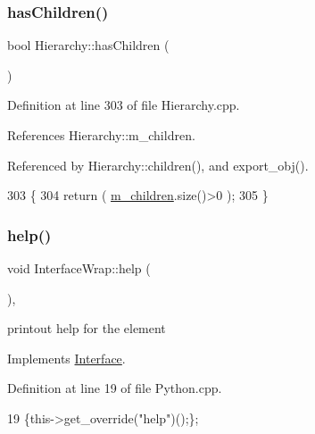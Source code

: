 \subsubsection{\texorpdfstring{has\+Children()}{hasChildren()}}
{\footnotesize\ttfamily bool Hierarchy\+::has\+Children (\begin{DoxyParamCaption}{ }\end{DoxyParamCaption})\hspace{0.3cm}{\ttfamily [inherited]}}



Definition at line 303 of file Hierarchy.\+cpp.



References Hierarchy\+::m\+\_\+children.



Referenced by Hierarchy\+::children(), and export\+\_\+obj().


\begin{DoxyCode}
303                               \{
304   \textcolor{keywordflow}{return} ( \hyperlink{classHierarchy_a038816763941fd4a930504917f60483b}{m\_children}.size()>0 );
305 \}
\end{DoxyCode}
\mbox{\label{structInterfaceWrap_abcf87065a7b9099a7d05e7c0ddaf2487}} 
\subsubsection{\texorpdfstring{help()}{help()}}
{\footnotesize\ttfamily void Interface\+Wrap\+::help (\begin{DoxyParamCaption}{ }\end{DoxyParamCaption})\hspace{0.3cm}{\ttfamily [inline]}, {\ttfamily [virtual]}}

printout help for the element 

Implements \hyperlink{classInterface_aedd3cf1d964c837e7848ccf81dc9c760}{Interface}.



Definition at line 19 of file Python.\+cpp.


\begin{DoxyCode}
19 \{this->get\_override(\textcolor{stringliteral}{"help"})();\};
\end{DoxyCode}
\mbox{\label{classObject_af99145335cc61ff6e2798ea17db009d2}} 
